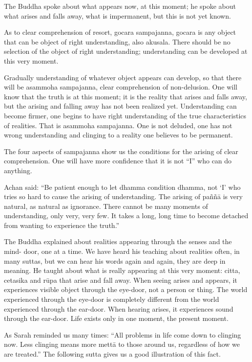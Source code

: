 The Buddha spoke about what appears now, at this moment; he spoke about what 
arises and falls away, what is impermanent, but this is not yet known. 

As to clear comprehension of resort, gocara sampajanna, gocara is any object that can 
be object of right understanding, also akusala. There should be no selection of the object of right understanding; understanding can be developed at this very moment. 

Gradually understanding of whatever object appears can develop, so that there will be 
asammoha sampajanna, clear comprehension of non-delusion. One will know that the 
truth is at this moment; it is the reality that arises and falls away, but the arising and 
falling away has not been realized yet. Understanding can become firmer, one begins 
to have right understanding of the true characteristics of realities. That is asammoha 
sampajanna. One is not deluded, one has not wrong understanding and clinging to a 
reality one believes to be permanent. 

The four aspects of sampajanna show us the conditions for the arising of clear comprehension. One will have more confidence that it is not ``I'' who can do anything. 

Achan said: ``Be patient enough to let dhamma condition dhamma, not `I' who tries 
so hard to cause the arising of understanding. The arising of paññā is very natural, as 
natural as ignorance. There cannot be many moments of understanding, only very, 
very few. It takes a long, long time to become detached from wanting to experience 
the truth.'' 

The Buddha explained about realities appearing through the senses and the mind- 
door, one at a time. We have heard his teaching about realities often, in many suttas, 
but we can hear his words again and again, they are deep in meaning. He taught about 
what is really appearing at this very moment: citta, cetasika and rūpa that arise and 
fall away. When seeing arises and appears, it experiences visible object through the 
eye-door, not a person or thing. The world experienced through the eye-door is completely different from the world experienced through the ear-door. When hearing 
arises, it experiences sound through the ear-door. Life exists only in one moment, the 
present moment. 

As Sarah reminded us many times: ``All problems in life come down to clinging now. 
Less clinging means more mettā to those around us, regardless of how we are 
treated.'' The following sutta gives us a good illustration of this fact. 

